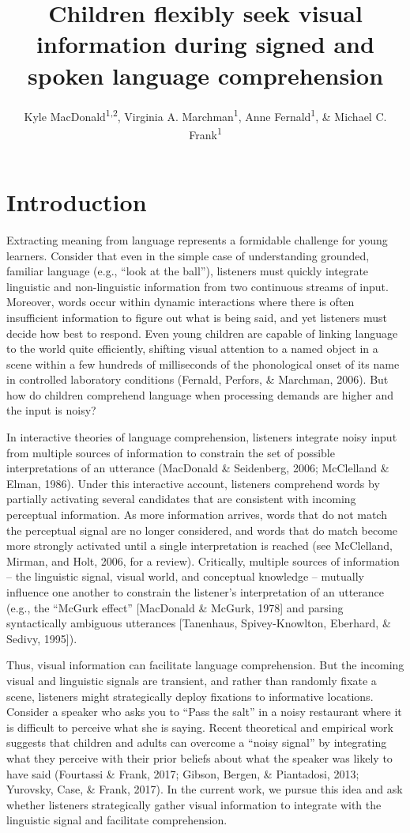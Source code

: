 \documentclass[,man,floatsintext]{apa6}
\title{Children flexibly seek visual information during signed and spoken language comprehension}
\author{Kyle MacDonald\textsuperscript{1,2}, Virginia A. Marchman\textsuperscript{1}, Anne Fernald\textsuperscript{1}, \& Michael C. Frank\textsuperscript{1}}
\date{}
\affiliation{
\vspace{0.5cm}
\textsuperscript{1} Stanford University\\\textsuperscript{2} University of California, Los Angeles}
\begin{document}
\maketitle

\hypertarget{introduction}{%
\section{Introduction}\label{introduction}}

Extracting meaning from language represents a formidable challenge for young learners. Consider that even in the simple case of understanding grounded, familiar language (e.g., \enquote{look at the ball}), listeners must quickly integrate linguistic and non-linguistic information from two continuous streams of input. Moreover, words occur within dynamic interactions where there is often insufficient information to figure out what is being said, and yet listeners must decide how best to respond. Even young children are capable of linking language to the world quite efficiently, shifting visual attention to a named object in a scene within a few hundreds of milliseconds of the phonological onset of its name in controlled laboratory conditions (Fernald, Perfors, \& Marchman, 2006). But how do children comprehend language when processing demands are higher and the input is noisy?

In interactive theories of language comprehension, listeners integrate noisy input from multiple sources of information to constrain the set of possible interpretations of an utterance (MacDonald \& Seidenberg, 2006; McClelland \& Elman, 1986). Under this interactive account, listeners comprehend words by partially activating several candidates that are consistent with incoming perceptual information. As more information arrives, words that do not match the perceptual signal are no longer considered, and words that do match become more strongly activated until a single interpretation is reached (see McClelland, Mirman, and Holt, 2006, for a review). Critically, multiple sources of information -- the linguistic signal, visual world, and conceptual knowledge -- mutually influence one another to constrain the listener's interpretation of an utterance (e.g., the \enquote{McGurk effect} {[}MacDonald \& McGurk, 1978{]} and parsing syntactically ambiguous utterances {[}Tanenhaus, Spivey-Knowlton, Eberhard, \& Sedivy, 1995{]}).

Thus, visual information can facilitate language comprehension. But the incoming visual and linguistic signals are transient, and rather than randomly fixate a scene, listeners might strategically deploy fixations to informative locations. Consider a speaker who asks you to \enquote{Pass the salt} in a noisy restaurant where it is difficult to perceive what she is saying. Recent theoretical and empirical work suggests that children and adults can overcome a \enquote{noisy signal} by integrating what they perceive with their prior beliefs about what the speaker was likely to have said (Fourtassi \& Frank, 2017; Gibson, Bergen, \& Piantadosi, 2013; Yurovsky, Case, \& Frank, 2017). In the current work, we pursue this idea and ask whether listeners strategically gather visual information to integrate with the linguistic signal and facilitate comprehension.
\end{document}
